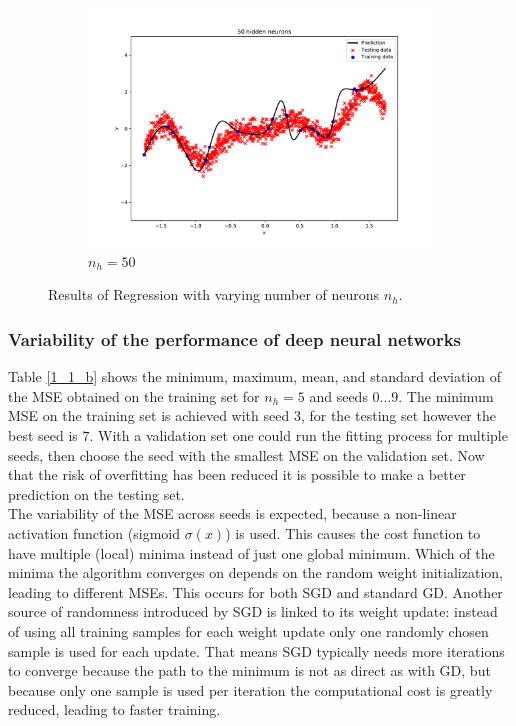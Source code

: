\documentclass{article}
\begin{document}
\begin{figure}[!ht]
\begin{subfigure}{0.78\textwidth}
\includegraphics[width=\textwidth]{./Figures/1_1_a_nh_50.pdf}
\caption{$n_h=50$}
\end{subfigure}

\caption{Results of Regression with varying number of neurons $n_h$.}
\label{1_1_a}
\end{figure}


\subsubsection{Variability of the performance of deep neural networks}

Table \ref{1_1_b} shows the minimum, maximum, mean, and standard deviation of the MSE obtained on the training set for $n_h=5$ and seeds $0 \dots 9$. The minimum MSE on the training set is achieved with seed $3$, for the testing set however the best seed is $7$. With a validation set one could run the fitting process for multiple seeds, then choose the seed with the smallest MSE on the validation set. Now that the risk of overfitting has been reduced it is possible to make a better prediction on the testing set.\\
The variability of the MSE across seeds is expected, because a non-linear activation function (sigmoid $\sigma(x)$) is used. This causes the cost function to have multiple (local) minima instead of just one global minimum. Which of the minima the algorithm converges on depends on the random weight initialization, leading to different MSEs. This occurs for both SGD and standard GD. Another source of randomness introduced by SGD is linked to its weight update: instead of using all training samples for each weight update only one randomly chosen sample is used for each update. That means SGD typically needs more iterations to converge because the path to the minimum is not as direct as with GD, but because only one sample is used per iteration the computational cost is greatly reduced, leading to faster training.
\end{document}
